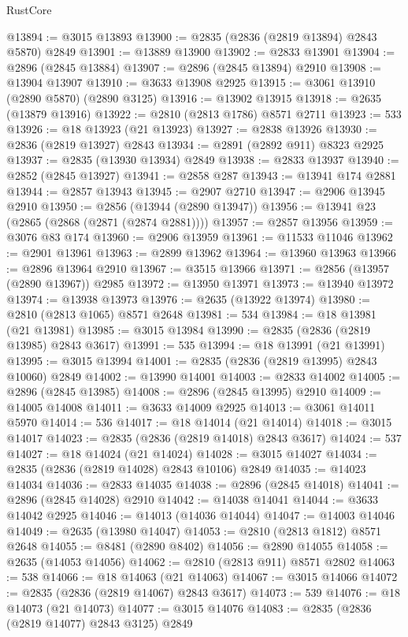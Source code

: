 \begin{lexlean}{RustCore}
\begin{coremodule}
@13894 := @3015 @13893
@13900 := @2835 (@2836 (@2819 @13894) @2843 @5870) @2849
@13901 := @13889 @13900
@13902 := @2833 @13901
@13904 := @2896 (@2845 @13884)
@13907 := @2896 (@2845 @13894) @2910
@13908 := @13904 @13907
@13910 := @3633 @13908 @2925
@13915 := @3061 @13910 (@2890 @5870) (@2890 @3125)
@13916 := @13902 @13915
@13918 := @2635 (@13879 @13916)
@13922 := @2810 (@2813 @1786) @8571 @2711
@13923 := 533
@13926 := @18 @13923 (@21 @13923)
@13927 := @2838 @13926
@13930 := @2836 (@2819 @13927) @2843
@13934 := @2891 (@2892 @911) @8323 @2925
@13937 := @2835 (@13930 @13934) @2849
@13938 := @2833 @13937
@13940 := @2852 (@2845 @13927)
@13941 := @2858 @287
@13943 := @13941 @174 @2881
@13944 := @2857 @13943
@13945 := @2907 @2710
@13947 := @2906 @13945 @2910
@13950 := @2856 (@13944 (@2890 @13947))
@13956 := @13941 @23 (@2865 (@2868 (@2871 (@2874 @2881))))
@13957 := @2857 @13956
@13959 := @3076 @83 @174
@13960 := @2906 @13959
@13961 := @11533 @11046
@13962 := @2901 @13961
@13963 := @2899 @13962
@13964 := @13960 @13963
@13966 := @2896 @13964 @2910
@13967 := @3515 @13966
@13971 := @2856 (@13957 (@2890 @13967)) @2985
@13972 := @13950 @13971
@13973 := @13940 @13972
@13974 := @13938 @13973
@13976 := @2635 (@13922 @13974)
@13980 := @2810 (@2813 @1065) @8571 @2648
@13981 := 534
@13984 := @18 @13981 (@21 @13981)
@13985 := @3015 @13984
@13990 := @2835 (@2836 (@2819 @13985) @2843 @3617)
@13991 := 535
@13994 := @18 @13991 (@21 @13991)
@13995 := @3015 @13994
@14001 := @2835 (@2836 (@2819 @13995) @2843 @10060) @2849
@14002 := @13990 @14001
@14003 := @2833 @14002
@14005 := @2896 (@2845 @13985)
@14008 := @2896 (@2845 @13995) @2910
@14009 := @14005 @14008
@14011 := @3633 @14009 @2925
@14013 := @3061 @14011 @5970
@14014 := 536
@14017 := @18 @14014 (@21 @14014)
@14018 := @3015 @14017
@14023 := @2835 (@2836 (@2819 @14018) @2843 @3617)
@14024 := 537
@14027 := @18 @14024 (@21 @14024)
@14028 := @3015 @14027
@14034 := @2835 (@2836 (@2819 @14028) @2843 @10106) @2849
@14035 := @14023 @14034
@14036 := @2833 @14035
@14038 := @2896 (@2845 @14018)
@14041 := @2896 (@2845 @14028) @2910
@14042 := @14038 @14041
@14044 := @3633 @14042 @2925
@14046 := @14013 (@14036 @14044)
@14047 := @14003 @14046
@14049 := @2635 (@13980 @14047)
@14053 := @2810 (@2813 @1812) @8571 @2648
@14055 := @8481 (@2890 @8402)
@14056 := @2890 @14055
@14058 := @2635 (@14053 @14056)
@14062 := @2810 (@2813 @911) @8571 @2802
@14063 := 538
@14066 := @18 @14063 (@21 @14063)
@14067 := @3015 @14066
@14072 := @2835 (@2836 (@2819 @14067) @2843 @3617)
@14073 := 539
@14076 := @18 @14073 (@21 @14073)
@14077 := @3015 @14076
@14083 := @2835 (@2836 (@2819 @14077) @2843 @3125) @2849

\end{coremodule}
\end{lexlean}
